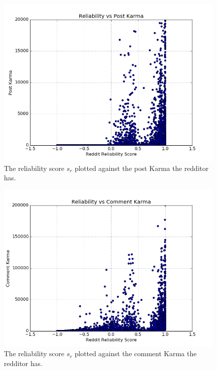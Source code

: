 \begin{figure}[tb]
    \centering
    \includegraphics[width=\linewidth]{../src/do_regression/figs/reliability_post_karma.png}
    \caption{The reliability score $s_r$ plotted against the post Karma the redditor has.}
    \label{fig:reliability_post_karma}
\end{figure}

\begin{figure}[tb]
    \centering
    \includegraphics[width=\linewidth]{../src/do_regression/figs/reliability_comment_karma.png}
    \caption{The reliability score $s_r$ plotted against the comment Karma the redditor has.}
    \label{fig:reliability_comment_karma}
\end{figure}

